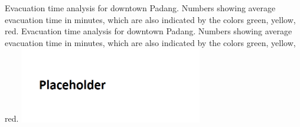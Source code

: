 %
\createfigure%
{Evacuation time analysis for downtown Padang. Numbers showing average evacuation time in minutes, which are also indicated by the colors green, yellow, red.}%
{Evacuation time analysis for downtown Padang. Numbers showing average evacuation time in minutes, which are also indicated by the colors green, yellow, red.}%
{\label{chap:using:padang}}%
{\includegraphics[width=0.6\textwidth, angle=0]{using/figures/dwntwnpdg}}%
{}

